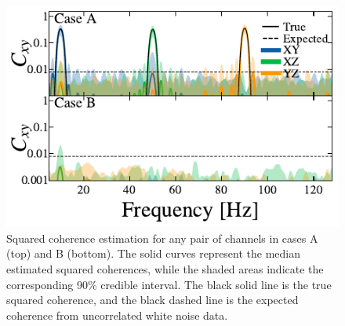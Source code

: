 \documentclass[%
 reprint,
 amsmath,amssymb,
 aps,
 nofootinbib,
]{revtex4-2}
\begin{document}
\begin{figure}
  \includegraphics[width=\columnwidth]{caseAB_coh.pdf}
  \caption{Squared coherence estimation for any pair of channels in cases A (top) and B (bottom). The solid curves represent the median estimated squared coherences, while the shaded areas indicate the corresponding 90\% credible interval.  The black solid line is the true squared coherence, and the black dashed line is the expected coherence from uncorrelated white noise data.}
  \label{fig:squared_coh}
\end{figure}

\end{document}
